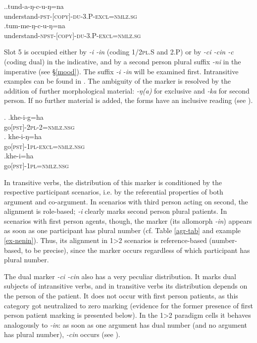 \ex.\ag.tund-a-ŋ-c-u-ŋ=na\\
understand{\scshape -pst-[copy]-du-3.P-excl=nmlz.sg}\\
\bg.tum-me-ŋ-c-u-ŋ=na\\
understand{\scshape -npst-[copy]-du-3.P-excl=nmlz.sg}\\

Slot 5 is occupied either by \emph{-i \ti -in} (coding {\scshape 1/2pl.S} and {\scshape 2.P}) or by \emph{-ci \ti -cin \ti -c} (coding dual) in the indicative, and by a second person plural suffix \emph{-ni} in the imperative (see §\ref{mood}). The suffix \emph{-i \ti -in} will be examined first. Intransitive examples can be found in \Next. The ambiguity of the marker is resolved by the addition of further morphological material: \emph{-ŋ(a)} for exclusive and \emph{-ka} for second person. If no further material is added, the forms have an inclusive reading (see \Next[c]).

	\ex. \ag.khe-i-g=ha\\
	go{\scshape [pst]-2pl-2=nmlz.nsg}\\
	\bg. khe-i-ŋ=ha\\
	go{\scshape [pst]-1pl-excl=nmlz.nsg}\\
	\bg.khe-i=ha\\
	go{\scshape [pst]-1pl=nmlz.nsg}\\

In transitive verbs, the distribution of this marker is conditioned by the respective participant  scenarios, i.e. by the referential properties of both argument and co-argument. In scenarios with third person acting on second, the alignment is role-based; \emph{-i} clearly marks second person plural patients. In scenarios with first person agents, though, the marker (its allomorph \emph{-in}) appears as soon as one parti\-cipant has plural number (cf. Table \ref{agr-tab} and example \ref{ex-nenin}). Thus, its alignment in 1>2 scenarios is reference-based (number-based, to be precise), since the marker occurs regardless of which participant has plural number. 

The dual marker \emph{-ci \ti -cin} also has a very peculiar distribution. It marks dual subjects of intransitive verbs, and in transitive verbs its distribution  depends on the person of the patient. It does not occur with first person patients, as this category got neutralized to zero marking (evidence for the former presence of first person patient marking is presented below). In the 1>2 paradigm cells it behaves analogously to \emph{-in}: as soon as one argument has dual number (and no argument has plural number), \emph{-cin} occurs (see \Next). 

